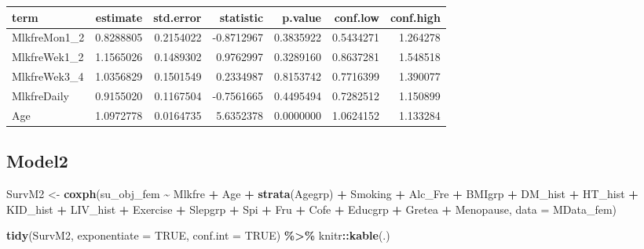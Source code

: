 \documentclass[
]{article}
\newenvironment{Shaded}{\begin{snugshade}}{\end{snugshade}}
\newcommand{\DataTypeTok}[1]{\textcolor[rgb]{0.13,0.29,0.53}{#1}}
\newcommand{\KeywordTok}[1]{\textcolor[rgb]{0.13,0.29,0.53}{\textbf{#1}}}
\newcommand{\NormalTok}[1]{#1}
\newcommand{\OperatorTok}[1]{\textcolor[rgb]{0.81,0.36,0.00}{\textbf{#1}}}
\newcommand{\OtherTok}[1]{\textcolor[rgb]{0.56,0.35,0.01}{#1}}
\newcommand{\StringTok}[1]{\textcolor[rgb]{0.31,0.60,0.02}{#1}}
\begin{document}
\begin{longtable}[]{@{}lrrrrrr@{}}
\toprule
term & estimate & std.error & statistic & p.value & conf.low &
conf.high\tabularnewline
\midrule
\endhead
MlkfreMon1\_2 & 0.8288805 & 0.2154022 & -0.8712967 & 0.3835922 &
0.5434271 & 1.264278\tabularnewline
MlkfreWek1\_2 & 1.1565026 & 0.1489302 & 0.9762997 & 0.3289160 &
0.8637281 & 1.548518\tabularnewline
MlkfreWek3\_4 & 1.0356829 & 0.1501549 & 0.2334987 & 0.8153742 &
0.7716399 & 1.390077\tabularnewline
MlkfreDaily & 0.9155020 & 0.1167504 & -0.7561665 & 0.4495494 & 0.7282512
& 1.150899\tabularnewline
Age & 1.0972778 & 0.0164735 & 5.6352378 & 0.0000000 & 1.0624152 &
1.133284\tabularnewline
\bottomrule
\end{longtable}

\hypertarget{model2-4}{%
\subsection{Model2}\label{model2-4}}

\begin{Shaded}
\begin{Highlighting}[]
\NormalTok{SurvM2 \textless{}{-}}\StringTok{  }\KeywordTok{coxph}\NormalTok{(su\_obj\_fem }\OperatorTok{\textasciitilde{}}\StringTok{ }\NormalTok{Mlkfre }\OperatorTok{+}\StringTok{ }\NormalTok{Age }\OperatorTok{+}\StringTok{ }\KeywordTok{strata}\NormalTok{(Agegrp) }\OperatorTok{+}\StringTok{ }\NormalTok{Smoking }\OperatorTok{+}\StringTok{ }\NormalTok{Alc\_Fre }\OperatorTok{+}\StringTok{ }
\StringTok{                   }\NormalTok{BMIgrp }\OperatorTok{+}\StringTok{ }\NormalTok{DM\_hist }\OperatorTok{+}\StringTok{ }\NormalTok{HT\_hist }\OperatorTok{+}\StringTok{ }\NormalTok{KID\_hist }\OperatorTok{+}\StringTok{ }\NormalTok{LIV\_hist }\OperatorTok{+}\StringTok{ }\NormalTok{Exercise }\OperatorTok{+}\StringTok{ }
\StringTok{                   }\NormalTok{Slepgrp }\OperatorTok{+}\StringTok{ }\NormalTok{Spi }\OperatorTok{+}\StringTok{ }\NormalTok{Fru }\OperatorTok{+}\StringTok{ }\NormalTok{Cofe }\OperatorTok{+}\StringTok{ }\NormalTok{Educgrp }\OperatorTok{+}\StringTok{ }\NormalTok{Gretea }\OperatorTok{+}\StringTok{ }\NormalTok{Menopause, }
                 \DataTypeTok{data =}\NormalTok{ MData\_fem)}

\KeywordTok{tidy}\NormalTok{(SurvM2, }\DataTypeTok{exponentiate =} \OtherTok{TRUE}\NormalTok{, }\DataTypeTok{conf.int =} \OtherTok{TRUE}\NormalTok{) }\OperatorTok{\%\textgreater{}\%}\StringTok{ }
\StringTok{  }\NormalTok{knitr}\OperatorTok{::}\KeywordTok{kable}\NormalTok{(.)}
\end{Highlighting}
\end{Shaded}
\end{document}
